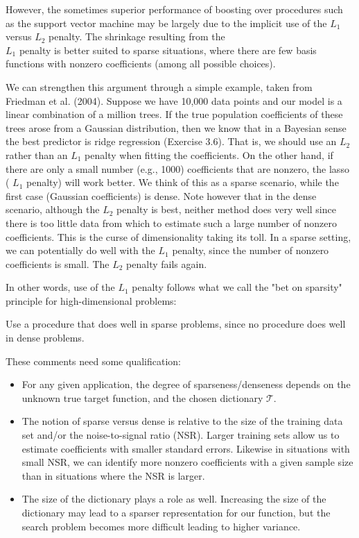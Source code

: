 \documentclass[10pt]{article}
\begin{document}
However, the sometimes superior performance of boosting over procedures such as the support vector machine may be largely due to the implicit use of the $L_{1}$ versus $L_{2}$ penalty. The shrinkage resulting from the\\
$L_{1}$ penalty is better suited to sparse situations, where there are few basis functions with nonzero coefficients (among all possible choices).

We can strengthen this argument through a simple example, taken from Friedman et al. (2004). Suppose we have 10,000 data points and our model is a linear combination of a million trees. If the true population coefficients of these trees arose from a Gaussian distribution, then we know that in a Bayesian sense the best predictor is ridge regression (Exercise 3.6). That is, we should use an $L_{2}$ rather than an $L_{1}$ penalty when fitting the coefficients. On the other hand, if there are only a small number (e.g., 1000) coefficients that are nonzero, the lasso ( $L_{1}$ penalty) will work better. We think of this as a sparse scenario, while the first case (Gaussian coefficients) is dense. Note however that in the dense scenario, although the $L_{2}$ penalty is best, neither method does very well since there is too little data from which to estimate such a large number of nonzero coefficients. This is the curse of dimensionality taking its toll. In a sparse setting, we can potentially do well with the $L_{1}$ penalty, since the number of nonzero coefficients is small. The $L_{2}$ penalty fails again.

In other words, use of the $L_{1}$ penalty follows what we call the "bet on sparsity" principle for high-dimensional problems:

Use a procedure that does well in sparse problems, since no procedure does well in dense problems.

These comments need some qualification:

\begin{itemize}
  \item For any given application, the degree of sparseness/denseness depends on the unknown true target function, and the chosen dictionary $\mathcal{T}$.
  \item The notion of sparse versus dense is relative to the size of the training data set and/or the noise-to-signal ratio (NSR). Larger training sets allow us to estimate coefficients with smaller standard errors. Likewise in situations with small NSR, we can identify more nonzero coefficients with a given sample size than in situations where the NSR is larger.
  \item The size of the dictionary plays a role as well. Increasing the size of the dictionary may lead to a sparser representation for our function, but the search problem becomes more difficult leading to higher variance.
\end{itemize}
\end{document}
